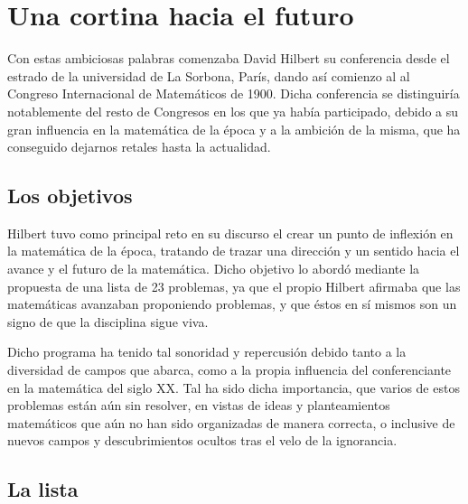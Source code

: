 
\chapter{Una cortina hacia el futuro}\label{ch:Hilbert-1}

Con estas ambiciosas palabras comenzaba David Hilbert su conferencia desde el estrado de la universidad de La Sorbona, París, dando
así comienzo al al Congreso Internacional de Matemáticos de 1900.
Dicha conferencia se distinguiría notablemente del resto de Congresos en los que ya había participado, debido a su gran influencia 
en la matemática de la época y a la ambición de la misma, que ha conseguido dejarnos retales hasta la actualidad. 


\section{Los objetivos}

Hilbert tuvo como principal reto en su discurso el crear un punto de inflexión en la matemática de la época, tratando de trazar 
una dirección y un sentido hacia el avance y el futuro de la matemática. Dicho objetivo lo abordó mediante la propuesta de una lista de 
23 problemas, ya que el propio Hilbert afirmaba que las matemáticas avanzaban proponiendo problemas, y que éstos en sí mismos 
son un signo de que la disciplina sigue viva.

Dicho programa ha tenido tal sonoridad y repercusión debido tanto a la diversidad de campos que abarca, como a la propia influencia 
del conferenciante en la matemática del siglo XX. Tal ha sido dicha importancia, que varios de estos problemas están aún sin resolver, 
en vistas de ideas y planteamientos matemáticos que aún no han sido organizadas de manera correcta, o inclusive de nuevos campos y 
descubrimientos ocultos tras el velo de la ignorancia.


\section{La lista}

